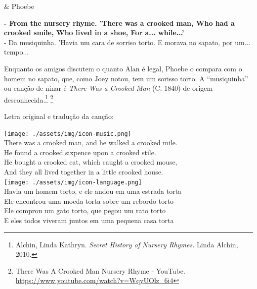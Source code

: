 \begin{tcolorbox}[enhanced,center upper,
    drop fuzzy shadow southeast, boxrule=0.3pt,
    lower separated=false, breakable,
    colframe=black!30!dialogoBorder,colback=white]
\begin{minipage}[c]{0.16\linewidth}
   & \centering \scriptsize{Phoebe}
\end{minipage}
\hfill
\begin{minipage}[c]{0.8\linewidth}
  \textbf{- From the nursery rhyme. 'There was a crooked man, Who had a crooked smile, Who lived in a shoe, For a... while...'}\\
  - Da musiquinha. 'Havia um cara de sorriso torto. E morava no sapato, por um... tempo...
\end{minipage}
\end{tcolorbox}

Enquanto os amigos discutem o quanto Alan é legal, Phoebe o compara com
o homem no sapato, que, como Joey notou, tem um sorisso torto. A
``musiquinha'' ou canção de ninar é \emph{There Was a Crooked Man} (C.
1840) de origem desconhecida.\footnote{Alchin, Linda Kathryn.
  \emph{Secret History of Nursery Rhymes.} Linda Alchin, 2010.}
\footnote{\sloppy There Was A Crooked Man Nursery Rhyme - YouTube. \url{https://www.youtube.com/watch?v=WqyUOlz_6i4}}

Letra original e tradução da canção:

\bigskip
\begin{tcolorbox}[enhanced,
    drop fuzzy shadow southeast, boxrule=0.3pt,
    lower separated=false, sidebyside, sidebyside align=top,
    halign=flush right, halign lower=left, breakable,
    colframe=black!30!dialogoBorder,colback=musicaBg]
\texttt{[image: ./assets/img/icon-music.png]}\\
There was a crooked man, and he walked a crooked mile.\\He found a crooked sixpence upon a crooked stile.\\He bought a crooked cat, which caught a crooked mouse,\\And they all lived together in a little crooked house.\\
\tcblower
\texttt{[image: ./assets/img/icon-language.png]}\\
Havia um homem torto, e ele andou em uma estrada torta\\Ele encontrou uma moeda torta sobre um rebordo torto\\Ele comprou um gato torto, que pegou um rato torto\\E eles todos viveram juntos em uma pequena casa torta\\
\end{tcolorbox}

